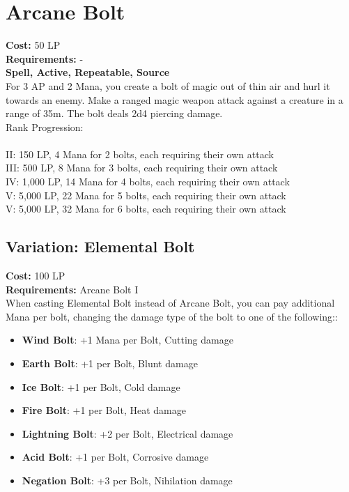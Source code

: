 \section{Arcane Bolt}\label{spell:arcaneBolt}
\textbf{Cost:} 50 LP\\
\textbf{Requirements:} -\\
\textbf{Spell, Active, Repeatable, Source}\\
For 3 AP and 2 Mana, you create a bolt of magic out of thin air and hurl it towards an enemy.
Make a ranged magic weapon attack against a creature in a range of 35m.
The bolt deals 2d4 piercing damage.
\\
Rank Progression:\\
\\
II: 150 LP, 4 Mana for 2 bolts, each requiring their own attack\\
III: 500 LP, 8 Mana for 3 bolts, each requiring their own attack\\
IV: 1,000 LP, 14 Mana for 4 bolts, each requiring their own attack\\
V: 5,000 LP, 22 Mana for 5 bolts, each requiring their own attack\\
V: 5,000 LP, 32 Mana for 6 bolts, each requiring their own attack\\

\subsection{Variation: Elemental Bolt}\label{spell:elementalBolt}
\textbf{Cost:} 100 LP\\
\textbf{Requirements:} Arcane Bolt I\\
When casting Elemental Bolt instead of Arcane Bolt, you can pay additional Mana per bolt, changing the damage type of the bolt to one of the following::\\
\begin{itemize}
    \item \textbf{Wind Bolt}: +1 Mana per Bolt, Cutting damage
    \item \textbf{Earth Bolt}: +1 per Bolt, Blunt damage
    \item \textbf{Ice Bolt}: +1 per Bolt, Cold damage
    \item \textbf{Fire Bolt}: +1 per Bolt, Heat damage
    \item \textbf{Lightning Bolt}: +2 per Bolt, Electrical damage
    \item \textbf{Acid Bolt}: +1 per Bolt, Corrosive damage
    \item \textbf{Negation Bolt}: +3 per Bolt, Nihilation damage
\end{itemize}
